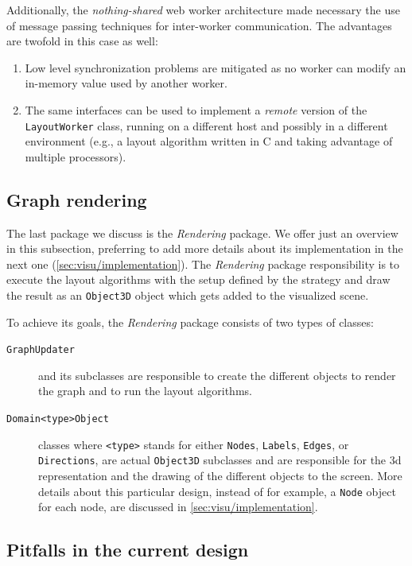 Additionally, the \emph{nothing-shared} web worker architecture made necessary the use of message passing techniques for inter-worker communication. The advantages are twofold in this case as well:

\begin{enumerate}
  \item Low level synchronization problems are mitigated as no worker can modify an in-memory value used by another worker.
  \item The same interfaces can be used to implement a \emph{remote} version of the \texttt{LayoutWorker} class, running on a different host and possibly in a different environment (e.g., a layout algorithm written in C and taking advantage of multiple processors).
\end{enumerate}

\subsection{Graph rendering}
\label{sec:visu/design/rendering}

The last package we discuss is the \emph{Rendering} package. We offer just an overview in this subsection, preferring to add more details about its implementation in the next one (\vref*{sec:visu/implementation}). The \emph{Rendering} package responsibility is to execute the layout algorithms with the setup defined by the strategy and draw the result as an \texttt{Object3D} object which gets added to the visualized scene.

To achieve its goals, the \emph{Rendering} package consists of two types of classes:
\begin{description}
  \item[\texttt{GraphUpdater}] and its subclasses are responsible to create the different objects to render the graph and to run the layout algorithms.
  \item[\texttt{Domain<type>Object}] classes where \texttt{<type>} stands for either \texttt{Nodes}, \texttt{Labels}, \texttt{Edges}, or \texttt{Directions}, are actual \texttt{Object3D} subclasses and are responsible for the \gls{3d} representation and the drawing of the different objects to the screen. More details about this particular design, instead of for example, a \texttt{Node} object for each node, are discussed in \vref{sec:visu/implementation}.
\end{description}

\subsection{Pitfalls in the current design}
\label{sec:visu/design/pitfalls}

